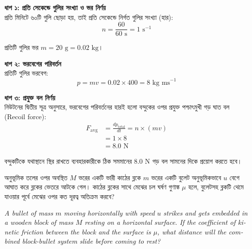 \documentclass[12pt, a4paper]{article}
\begin{document}
\begin{tcolorbox}[solutionbox={সমাধান (Solution)}]
    \noindent
    \textbf{ধাপ ১: প্রতি সেকেন্ডে গুলির সংখ্যা ও ভর নির্ণয়} \\
    প্রতি মিনিটে ৬০টি গুলি ছোড়া হয়, তাই প্রতি সেকেন্ডে নির্গত গুলির সংখ্যা (হার):
    \[ n = \frac{60}{60\text{ s}} = 1\text{ s}^{-1} \]
    
    প্রতিটি গুলির ভর $m = 20\text{ g} = 0.02\text{ kg}$।
    
    \vspace{0.5em}
    \noindent\textbf{ধাপ ২: ভরবেগের পরিবর্তন} \\
    প্রতিটি গুলির ভরবেগ:
    \[ p = m v = 0.02 \times 400 = 8\text{ kg ms}^{-1} \]
    
    \vspace{0.5em}
    \noindent\textbf{ধাপ ৩: প্রযুক্ত বল নির্ণয়} \\
    নিউটনের দ্বিতীয় সূত্র অনুসারে, ভরবেগের পরিবর্তনের হারই হলো বন্দুকের ওপর প্রযুক্ত পশ্চাৎমুখী গড় ঘাত বল (Recoil force):
    \begin{align*}
        F_{\text{avg}} &= \frac{dp_{\text{total}}}{dt} = n \times (mv) \\
                       &= 1 \times 8 \\
                       &= \mathbf{8.0}\text{ N}
    \end{align*}
    
    বন্দুকটিকে যথাস্থানে স্থির রাখতে ব্যবহারকারীকে ঠিক সমমানের $8.0\text{ N}$ গড় বল সামনের দিকে প্রয়োগ করতে হবে।
\end{tcolorbox}

\newpage

\begin{tcolorbox}[questionbox={প্রশ্ন (Question) 34}]
    \noindent
    অনুভূমিক তলের ওপর অবস্থিত $M$ ভরের একটি ভারী কাঠের ব্লকে $m$ ভরের একটি বুলেট অনুভূমিকভাবে $u$ বেগে আঘাত করে ব্লকের ভেতরে আটকে গেল। কাঠের ব্লকের সাথে মেঝের চল ঘর্ষণ গুণাঙ্ক $\mu$ হলে, বুলেটসহ ব্লকটি থেমে যাওয়ার পূর্বে মেঝের ওপর কত দূরত্ব অতিক্রম করবে?
    
    \vspace{0.8em}
    \begin{english}
    \noindent\textit{\color{darkgray}
    A bullet of mass $m$ moving horizontally with speed $u$ strikes and gets embedded in a wooden block of mass $M$ resting on a horizontal surface. If the coefficient of kinetic friction between the block and the surface is $\mu$, what distance will the combined block-bullet system slide before coming to rest?
    }
    \end{english}
\end{tcolorbox}
\end{document}
